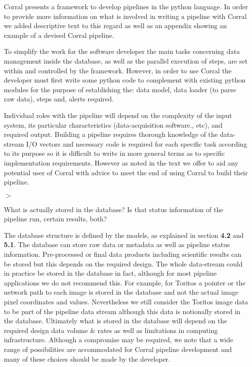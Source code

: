 \documentclass[a4paper,onecolumn,fleqn,usenatbib,useAMS]{mnrasr}
\newenvironment{myindentpar}[1]%
 {\begin{list}{}%
         \bigskip
         \color{refereecolor}
         {\setlength{\leftmargin}{#1}}%
         \itshape
         \item[$>$]%
 }
 {\end{list}}
\begin{document}
%
Corral presents a framework to develop pipelines in the python language.
In order to provide more information on what is involved in writing a
pipeline with Corral we added descriptive text to this regard as
well as an appendix showing an example of a devised Corral
pipeline. 

To simplify the work for the software developer the main tasks
concerning data management inside the database, as well as the parallel
execution of steps, are set within and controlled by the framework. However, in
order to use Corral the developer must first write some python code to 
complement with existing python modules for the purpose of establishing the: data model,
data loader (to parse raw data), steps and, alerts required.

Individual roles with the pipeline will depend on the complexity of
the input system, its particular characteristics (data-acquisition
software., etc), and required output.
%
Building a pipeline requires thorough knowledge of the data-stream I/O 
vectors and necessary code is required for each specific task according to its
purpose so it is difficult to write in more general terms as to specific 
implementation requirements. However as noted in the text we offer to aid 
any potential user of Corral with advice to meet the end of using Corral 
to build their pipeline.

\begin{myindentpar}{1cm}
What is actually stored in the database? Is that status information
of the pipeline run, certain results, both? 
\end{myindentpar}

%
The database structure is defined by the models, as explained in
section \textbf{4.2} and \textbf{5.1}. 
%
The database can store raw data
or metadata as well as pipeline status information. 
%
Pre-processed or
final data products including scientific results can be stored but
this depends on the required design. The whole data-stream
could in practice be stored in the database in fact, although for 
most pipeline applications we do not recommend this. 
%
For example, for Toritos a pointer or the network path to each image 
is stored in the database and not the actual image pixel coordinates and values. 
%
Nevertheless we still consider the Toritos image data to be part of the
pipeline data stream although this data is notionally stored in the database. 
%
Ultimately what is stored in the database will depend on the
required design data volume \& rates as well as limitations in
computing infrastructure.  
%
Although a compromise may be required, we
note that a wide range of possibilities are accommodated for Corral
pipeline development and many of these choices should be made by the
developer.
\end{document}
